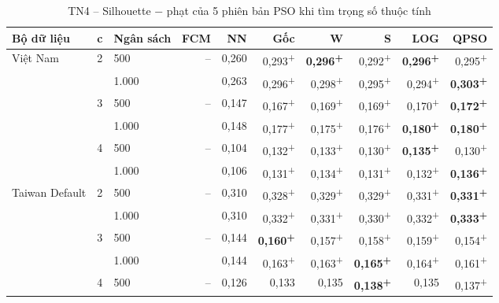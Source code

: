 \begin{table}[htbp]
\centering
\caption{TN4 -- Silhouette − phạt của 5 phiên bản PSO khi tìm trọng số thuộc tính}
\label{tab:e9-diem}
\footnotesize
\setlength{\tabcolsep}{3pt}
\begin{tabular}{@{}lllrrrrrrr@{}}
\toprule
Bộ dữ liệu & c & Ngân sách & FCM & NN & Gốc & W & S & LOG & QPSO \\
\midrule
Việt Nam & 2 & 500 & -- & 0,260 & 0,293\textsuperscript{+} & \textbf{0,296\textsuperscript{+}} & 0,292\textsuperscript{+} & \textbf{0,296\textsuperscript{+}} & 0,295\textsuperscript{+} \\
 &  & 1.000 &  & 0,263 & 0,296\textsuperscript{+} & 0,298\textsuperscript{+} & 0,295\textsuperscript{+} & 0,294\textsuperscript{+} & \textbf{0,303\textsuperscript{+}} \\
 & 3 & 500 & -- & 0,147 & 0,167\textsuperscript{+} & 0,169\textsuperscript{+} & 0,169\textsuperscript{+} & 0,170\textsuperscript{+} & \textbf{0,172\textsuperscript{+}} \\
 &  & 1.000 &  & 0,148 & 0,177\textsuperscript{+} & 0,175\textsuperscript{+} & 0,176\textsuperscript{+} & \textbf{0,180\textsuperscript{+}} & \textbf{0,180\textsuperscript{+}} \\
 & 4 & 500 & -- & 0,104 & 0,132\textsuperscript{+} & 0,133\textsuperscript{+} & 0,130\textsuperscript{+} & \textbf{0,135\textsuperscript{+}} & 0,130\textsuperscript{+} \\
 &  & 1.000 &  & 0,106 & 0,131\textsuperscript{+} & 0,134\textsuperscript{+} & 0,131\textsuperscript{+} & 0,132\textsuperscript{+} & \textbf{0,136\textsuperscript{+}} \\
\midrule
Taiwan Default & 2 & 500 & -- & 0,310 & 0,328\textsuperscript{+} & 0,329\textsuperscript{+} & 0,329\textsuperscript{+} & 0,331\textsuperscript{+} & \textbf{0,331\textsuperscript{+}} \\
 &  & 1.000 &  & 0,310 & 0,332\textsuperscript{+} & 0,331\textsuperscript{+} & 0,330\textsuperscript{+} & 0,332\textsuperscript{+} & \textbf{0,333\textsuperscript{+}} \\
 & 3 & 500 & -- & 0,144 & \textbf{0,160\textsuperscript{+}} & 0,157\textsuperscript{+} & 0,158\textsuperscript{+} & 0,159\textsuperscript{+} & 0,154\textsuperscript{+} \\
 &  & 1.000 &  & 0,144 & 0,163\textsuperscript{+} & 0,163\textsuperscript{+} & \textbf{0,165\textsuperscript{+}} & 0,164\textsuperscript{+} & 0,161\textsuperscript{+} \\
 & 4 & 500 & -- & 0,126 & 0,133 & 0,135 & \textbf{0,138\textsuperscript{+}} & 0,135 & 0,137\textsuperscript{+} \\

\end{tabular}
\end{table}
